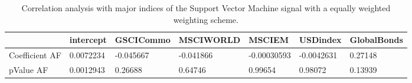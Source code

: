 \begin{table}[H]
\centering
\begin{tabular}{lllllll}
& intercept & GSCICommo & MSCIWORLD & MSCIEM & USDindex & GlobalBonds \\ 
\hline 
Coefficient AF & 0.0072234 & -0.045667 & -0.041866 & -0.00030593 & -0.0042631 & 0.27148 \\ 
pValue AF & 0.0012943 & 0.26688 & 0.64746 & 0.99654 & 0.98072 & 0.13939 \\ 
\hline
\end{tabular}
\caption{Correlation analysis with major indices of the Support Vector Machine signal with a equally weighted weighting scheme.}
\label{SVM_MODEL_EW_AFACTOR}
\end{table}